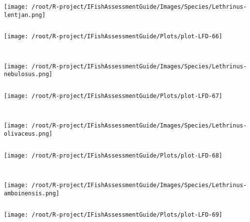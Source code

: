 \begin{knitrout}
\begin{kframe}
\begin{verbatim}
\end{verbatim}
\end{kframe}
\texttt{[image: /root/R-project/IFishAssessmentGuide/Images/Species/Lethrinus-lentjan.png]}
\begin{kframe}\begin{verbatim}
\end{verbatim}
\end{kframe}
\texttt{[image: /root/R-project/IFishAssessmentGuide/Plots/plot-LFD-66]} 
\begin{kframe}\begin{verbatim}
 
\end{verbatim}
\end{kframe}
\texttt{[image: /root/R-project/IFishAssessmentGuide/Images/Species/Lethrinus-nebulosus.png]}
\begin{kframe}\begin{verbatim}
\end{verbatim}
\end{kframe}
\texttt{[image: /root/R-project/IFishAssessmentGuide/Plots/plot-LFD-67]} 
\begin{kframe}\begin{verbatim}
 
\end{verbatim}
\end{kframe}
\texttt{[image: /root/R-project/IFishAssessmentGuide/Images/Species/Lethrinus-olivaceus.png]}
\begin{kframe}\begin{verbatim}
\end{verbatim}
\end{kframe}
\texttt{[image: /root/R-project/IFishAssessmentGuide/Plots/plot-LFD-68]} 
\begin{kframe}\begin{verbatim}
 
\end{verbatim}
\end{kframe}
\texttt{[image: /root/R-project/IFishAssessmentGuide/Images/Species/Lethrinus-amboinensis.png]}
\begin{kframe}\begin{verbatim}
\end{verbatim}
\end{kframe}
\texttt{[image: /root/R-project/IFishAssessmentGuide/Plots/plot-LFD-69]} 
\begin{kframe}\begin{verbatim}
 

\end{verbatim}
\end{kframe}
\end{knitrout}
